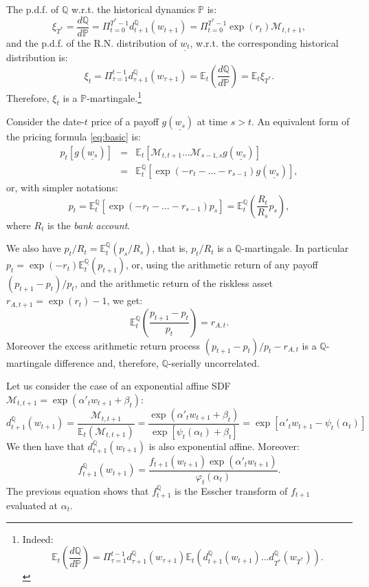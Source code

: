 \documentclass[
  12pt,
]{book}
\theoremstyle{definition}
\theoremstyle{definition}
\theoremstyle{definition}
\theoremstyle{definition}
\theoremstyle{remark}
\begin{document}
The p.d.f. of \(\mathbb{Q}\) w.r.t. the historical dynamics \(\mathbb{P}\) is:
\[
\xi_{T^*} =  \frac{d\mathbb{Q}}{d\mathbb{P}} =
\Pi^{T^{*}-1}_{t=0} d^{\mathbb{Q}}_{t+1}(w_{t+1}) =
\Pi^{T^{*}-1}_{t=0} \exp(r_{t}) \mathcal{M}_{t,t+1},
\]
and the p.d.f. of the R.N. distribution of \(\underline{w_t}\), w.r.t. the corresponding historical distribution is:
\[
\xi_t= \Pi^{t-1}_{\tau=1}
d^{\mathbb{Q}}_{\tau+1}(w_{\tau+1})=\mathbb{E}_t\left(\frac{d\mathbb{Q}}{d\mathbb{P}}\right) = \mathbb{E}_t\xi_{T^*}.
\]
Therefore, \(\xi_t\) is a \(\mathbb{P}\)-martingale.\footnote{Indeed:
  \[
  \mathbb{E}_t \left( \frac{d\mathbb{Q}}{d\mathbb{P}}\right) = \Pi^{t-1}_{\tau = 1} d^{\mathbb{Q}}_{\tau + 1} (w_{\tau+1}) \mathbb{E}_t \left( d^{\mathbb{Q}}_{t+1} (w_{t+1}) \ldots d^{\mathbb{Q}}_{T^*} (w_{T^*})\right).
  \]}

Consider the date-\(t\) price of a payoff \(g(\underline{w_s})\) at time \(s>t\). An equivalent form of the pricing formula \eqref{eq:basic} is:
\begin{eqnarray*}
p_t[g(\underline{w_s})] &=& \mathbb{E}_t[\mathcal{M}_{t,t+1}...\mathcal{M}_{s-1,s}g(\underline{w_s})] \\
&=& \mathbb{E}^{\mathbb{Q}}_t[\exp(-r_{t}-...-r_{s-1})g(\underline{w_s})],
\end{eqnarray*}
or, with simpler notations:
\[
p_t = \mathbb{E}^{\mathbb{Q}}_t[\exp(-r_{t}-...-r_{s-1})p_s] = \mathbb{E}^{\mathbb{Q}}_t\left(\frac{R_t}{R_s} p_s\right),
\]
where \(R_t\) is the \emph{bank account}.

We also have \(p_t/R_t = \mathbb{E}^{\mathbb{Q}}_t\left( p_s/R_s\right)\), that is, \(p_t/R_t\) is a \(\mathbb{Q}\)-martingale. In particular \(p_t = \exp(-r_{t})\mathbb{E}^{\mathbb{Q}}_t(p_{t+1})\), or, using the arithmetic return of any payoff \((p_{t+1}-p_t)/p_t\), and the arithmetic return of the riskless asset \(r_{A,t+1}=\exp(r_{t})-1\), we get:
\[
\mathbb{E}^{\mathbb{Q}}_t\left(\frac{p_{t+1}-p_t}{p_t}\right)=r_{A,t}.
\]
Moreover the excess arithmetic return process \((p_{t+1}-p_t)/p_t-r_{A,t}\) is a \(\mathbb{Q}\)-martingale difference and, therefore, \(\mathbb{Q}\)-serially uncorrelated.

Let us consider the case of an exponential affine SDF \(\mathcal{M}_{t,t+1}=\exp(\alpha'_t w_{t+1}+\beta_t)\):
\[
d^{\mathbb{Q}}_{t+1}(w_{t+1}) = \frac{\mathcal{M}_{t,t+1}}{\mathbb{E}_t(\mathcal{M}_{t,t+1})} = \frac{\exp(\alpha'_t
w_{t+1}+\beta_t)}{\exp[\psi_t(\alpha_t)+\beta_t]} = \exp[\alpha'_t w_{t+1}-\psi_t(\alpha_t)]
\]
We then have that \(d^{\mathbb{Q}}_{t+1}(w_{t+1})\) is also exponential affine. Moreover:
\[
f^{\mathbb{Q}}_{t+1} (w_{t+1}) = \frac{f_{t+1} (w_{t+1}) \exp (\alpha'_t w_{t+1})}{\varphi_t (\alpha_t)}.
\]
The previous equation shows that \(f^{\mathbb{Q}}_{t+1}\) is the Esscher transform of \(f_{t+1}\) evaluated at \(\alpha_t\).
\end{document}
